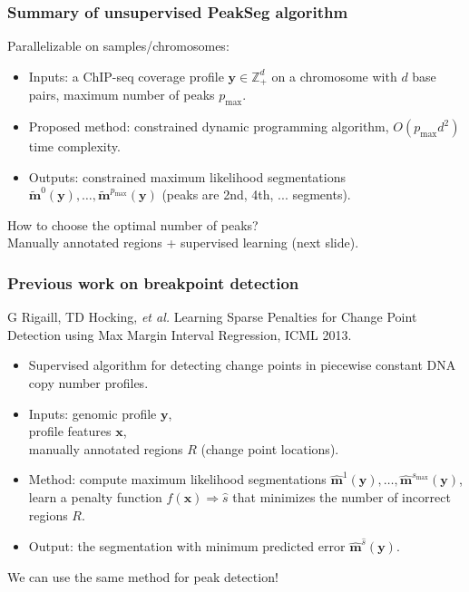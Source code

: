 \documentclass{beamer}
\newcommand{\ZZ}{\mathbb Z}
\begin{document}


\begin{frame}
  \frametitle{Summary of unsupervised PeakSeg algorithm}
  Parallelizable on samples/chromosomes:
  \begin{itemize}
  \item Inputs: a ChIP-seq coverage profile $\mathbf y\in\ZZ_+^d$ on a
    chromosome with $d$ base pairs, maximum number of peaks
    $p_{\text{max}}$.
  \item Proposed method: constrained 
    dynamic programming
    algorithm,
    $O(p_{\text{max}} d^2)$ time complexity.
  \item Outputs: constrained maximum likelihood segmentations
    $\mathbf{\tilde m}^0(\mathbf y), 
    \dots, 
    \mathbf{\tilde m}^{p_{\text{max}}}(\mathbf y)$ 
    (peaks are 2nd, 4th, ... segments).
  \end{itemize}
  How to choose the optimal number of peaks?\\
  Manually annotated regions + supervised learning (next slide).
\end{frame}

\begin{frame}
  \frametitle{Previous work on breakpoint detection}
  G Rigaill, TD Hocking, \emph{et al.} Learning Sparse Penalties for Change
  Point Detection using Max Margin Interval Regression, ICML 2013.
  \begin{itemize}
  \item Supervised algorithm for detecting change points in piecewise
    constant DNA copy number profiles.
  \item Inputs: genomic profile $\mathbf y$, \\
    profile features $\mathbf x$, \\
    manually annotated regions $R$ (change point locations).
  \item Method: compute maximum likelihood segmentations $\mathbf{\hat
      m}^1(\mathbf y), \dots, \mathbf{\hat m}^{s_{\text{max}}}(\mathbf
    y)$, learn a penalty function $f(\mathbf x) \Rightarrow \hat s$
    that minimizes the number of incorrect regions $R$.
    \item Output: the segmentation with minimum predicted error
      $\mathbf{\hat m}^{\hat s}(\mathbf y)$.
  \end{itemize}
  We can use the same method for peak detection!
\end{frame}
\end{document}

